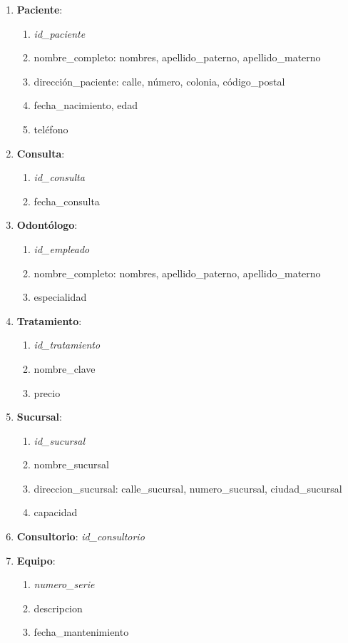 \documentclass[a4paper,12pt]{article}
\begin{document}
\begin{enumerate}
	\item \textbf{Paciente}:
		\begin{enumerate}
			\item \emph{id\_paciente}
			\item nombre\_completo: nombres, apellido\_paterno, apellido\_materno
			\item dirección\_paciente: calle, número, colonia, código\_postal
			\item fecha\_nacimiento, edad
			\item teléfono
		\end{enumerate}

	\item \textbf{Consulta}:
		\begin{enumerate}
			\item \emph{id\_consulta}
			\item fecha\_consulta
		\end{enumerate}


	\item \textbf{Odontólogo}:
		\begin{enumerate}
			\item \emph{id\_empleado}
			\item nombre\_completo: nombres, apellido\_paterno, apellido\_materno
			\item especialidad
		\end{enumerate}


	\item \textbf{Tratamiento}:
		\begin{enumerate}
			\item  \emph{id\_tratamiento}
			\item nombre\_clave
			\item precio
		\end{enumerate}


	\item \textbf{Sucursal}:
		\begin{enumerate}
			\item \emph{id\_sucursal}
			\item nombre\_sucursal
			\item direccion\_sucursal: calle\_sucursal, numero\_sucursal, ciudad\_sucursal
			\item capacidad
		\end{enumerate}


	\item \textbf{Consultorio}: \emph{id\_consultorio}

	\item \textbf{Equipo}:
		\begin{enumerate}
			\item \emph{numero\_serie}
			\item descripcion
			\item fecha\_mantenimiento
		\end{enumerate}

\end{enumerate}
\end{document}
